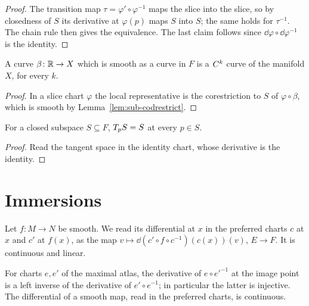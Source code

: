 \begin{proof}
  \leanok
  The transition map $\tau = \varphi' \circ \varphi^{-1}$ maps the slice into the slice, so by
  closedness of $S$ its derivative at $\varphi(p)$ maps $S$ into $S$; the same holds for
  $\tau^{-1}$. The chain rule then gives the equivalence. The last claim follows since
  $\dd\varphi \circ \dd\varphi^{-1}$ is the identity.
\end{proof}

\begin{proposition}[Curves]
  \label{prop:sub-curves}
  \leanok
  A curve $\beta \colon \mathbb{R} \to X$ which is smooth as a curve in $F$ is a $C^{k}$ curve of the
  manifold $X$, for every $k$.
\end{proposition}

\begin{proof}
  \leanok
  In a slice chart $\varphi$ the local representative is the corestriction to $S$ of
  $\varphi \circ \beta$, which is smooth by Lemma~\ref{lem:sub-codrestrict}.
\end{proof}

\begin{proposition}
  \label{prop:sub-tangent-subspace}
  \leanok
  For a closed subspace $S \subseteq F$, $T_p S = S$ at every $p \in S$.
\end{proposition}

\begin{proof}
  \leanok
  Read the tangent space in the identity chart, whose derivative is the identity.
\end{proof}

\section{Immersions}

Let $f \colon M \to N$ be smooth. We read its differential at $x$ in the preferred charts
$c$ at $x$ and $c'$ at $f(x)$, as the map
$v \mapsto \dd(c' \circ f \circ c^{-1})(c(x))(v)$, $E \to F$. It is continuous and linear.

\begin{lemma}
  \label{lem:sub-transition-inverse}
  \leanok
  For charts $e, e'$ of the maximal atlas, the derivative of $e \circ e'^{-1}$ at the image
  point is a left inverse of the derivative of $e' \circ e^{-1}$; in particular the latter is
  injective. The differential of a smooth map, read in the preferred charts, is continuous.
\end{lemma}

